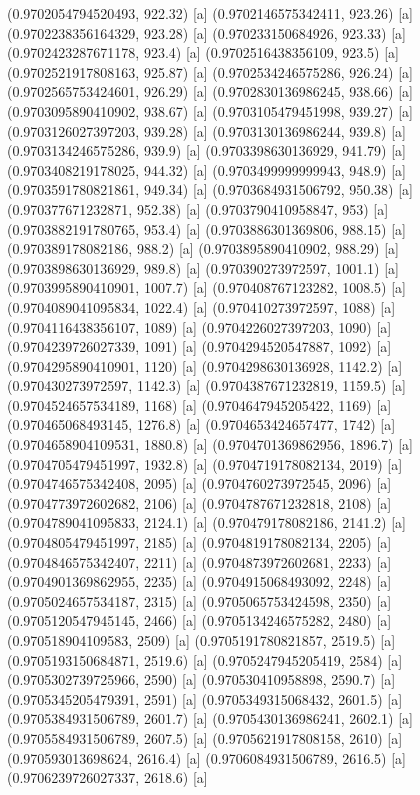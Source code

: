{{{(0.9702054794520493, 922.32) [a] 
(0.9702146575342411, 923.26) [a] 
(0.9702238356164329, 923.28) [a] 
(0.970233150684926, 923.33) [a] 
(0.9702423287671178, 923.4) [a] 
(0.9702516438356109, 923.5) [a] 
(0.9702521917808163, 925.87) [a] 
(0.9702534246575286, 926.24) [a] 
(0.9702565753424601, 926.29) [a] 
(0.9702830136986245, 938.66) [a] 
(0.9703095890410902, 938.67) [a] 
(0.9703105479451998, 939.27) [a] 
(0.9703126027397203, 939.28) [a] 
(0.9703130136986244, 939.8) [a] 
(0.9703134246575286, 939.9) [a] 
(0.9703398630136929, 941.79) [a] 
(0.9703408219178025, 944.32) [a] 
(0.9703499999999943, 948.9) [a] 
(0.9703591780821861, 949.34) [a] 
(0.9703684931506792, 950.38) [a] 
(0.970377671232871, 952.38) [a] 
(0.9703790410958847, 953) [a] 
(0.9703882191780765, 953.4) [a] 
(0.9703886301369806, 988.15) [a] 
(0.970389178082186, 988.2) [a] 
(0.9703895890410902, 988.29) [a] 
(0.9703898630136929, 989.8) [a] 
(0.970390273972597, 1001.1) [a] 
(0.9703995890410901, 1007.7) [a] 
(0.970408767123282, 1008.5) [a] 
(0.9704089041095834, 1022.4) [a] 
(0.970410273972597, 1088) [a] 
(0.9704116438356107, 1089) [a] 
(0.9704226027397203, 1090) [a] 
(0.9704239726027339, 1091) [a] 
(0.9704294520547887, 1092) [a] 
(0.9704295890410901, 1120) [a] 
(0.9704298630136928, 1142.2) [a] 
(0.970430273972597, 1142.3) [a] 
(0.9704387671232819, 1159.5) [a] 
(0.9704524657534189, 1168) [a] 
(0.9704647945205422, 1169) [a] 
(0.970465068493145, 1276.8) [a] 
(0.9704653424657477, 1742) [a] 
(0.9704658904109531, 1880.8) [a] 
(0.9704701369862956, 1896.7) [a] 
(0.9704705479451997, 1932.8) [a] 
(0.9704719178082134, 2019) [a] 
(0.9704746575342408, 2095) [a] 
(0.9704760273972545, 2096) [a] 
(0.9704773972602682, 2106) [a] 
(0.9704787671232818, 2108) [a] 
(0.9704789041095833, 2124.1) [a] 
(0.970479178082186, 2141.2) [a] 
(0.9704805479451997, 2185) [a] 
(0.9704819178082134, 2205) [a] 
(0.9704846575342407, 2211) [a] 
(0.9704873972602681, 2233) [a] 
(0.9704901369862955, 2235) [a] 
(0.9704915068493092, 2248) [a] 
(0.9705024657534187, 2315) [a] 
(0.9705065753424598, 2350) [a] 
(0.9705120547945145, 2466) [a] 
(0.9705134246575282, 2480) [a] 
(0.970518904109583, 2509) [a] 
(0.9705191780821857, 2519.5) [a] 
(0.9705193150684871, 2519.6) [a] 
(0.9705247945205419, 2584) [a] 
(0.9705302739725966, 2590) [a] 
(0.970530410958898, 2590.7) [a] 
(0.9705345205479391, 2591) [a] 
(0.9705349315068432, 2601.5) [a] 
(0.9705384931506789, 2601.7) [a] 
(0.9705430136986241, 2602.1) [a] 
(0.9705584931506789, 2607.5) [a] 
(0.9705621917808158, 2610) [a] 
(0.970593013698624, 2616.4) [a] 
(0.9706084931506789, 2616.5) [a] 
(0.9706239726027337, 2618.6) [a] 
}}}
